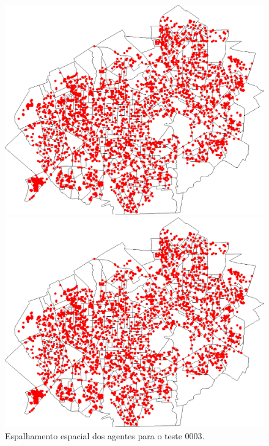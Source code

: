 \begin{figure}[H]
\begin{minipage}{.5\textwidth}
    \captionsetup{labelformat=empty}
  \end{minipage}
  \begin{minipage}{.5\textwidth}
    \centering
    \includegraphics[width=1.0\textwidth]{Figuras/Resultados/0003/Saidas/MonteCarlo_0/Simulacao_0/Acumulado/00160.png}
    \captionsetup{labelformat=empty}
  \end{minipage}%
  \begin{minipage}{.5\textwidth}
    \centering
    \includegraphics[width=1.0\textwidth]{Figuras/Resultados/0003/Saidas/MonteCarlo_0/Simulacao_0/Acumulado/00200.png}
    \captionsetup{labelformat=empty}
  \end{minipage}
  \caption{Espalhamento espacial dos agentes para o teste 0003.}
  \label{fig:espacial_0003}
\end{figure}

